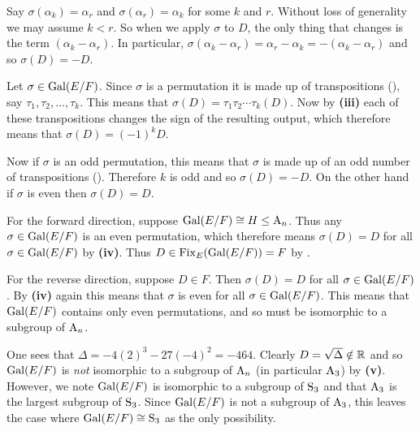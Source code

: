 \begin{questions}
\begin{partquestions}{\roman*}
        \item Say $\sigma(\alpha_k) = \alpha_r$ and $\sigma(\alpha_r) = \alpha_k$ for some $k$ and $r$. Without loss of generality we may assume $k < r$. So when we apply $\sigma$ to $D$, the only thing that changes is the term $(\alpha_k - \alpha_r)$. In particular, $\sigma(\alpha_k - \alpha_r) = \alpha_r - \alpha_k = -(\alpha_k - \alpha_r)$ and so $\sigma(D) = -D$.

        \item Let $\sigma \in \mathrm{Gal}(E/F)$. Since $\sigma$ is a permutation it is made up of transpositions (), say $\tau_1, \tau_2, \dots, \tau_k$. This means that $\sigma(D) = \tau_1\tau_2\cdots\tau_k(D)$. Now by \textbf{(iii)} each of these transpositions changes the sign of the resulting output, which therefore means that $\sigma(D) = (-1)^kD$.

        Now if $\sigma$ is an odd permutation, this means that $\sigma$ is made up of an odd number of transpositions (). Therefore $k$ is odd and so $\sigma(D) = -D$. On the other hand if $\sigma$ is even then $\sigma(D) = D$.

        \item For the forward direction, suppose $\mathrm{Gal}(E/F) \cong H \leq \mathrm{A}_{n}$. Thus any $\sigma \in \mathrm{Gal}(E/F)$ is an even permutation, which therefore means $\sigma(D) = D$ for all $\sigma \in \mathrm{Gal}(E/F)$ by \textbf{(iv)}. Thus $D \in \mathrm{Fix}_{E}(\mathrm{Gal}(E/F)) = F$ by .

        For the reverse direction, suppose $D \in F$. Then $\sigma(D) = D$ for all $\sigma \in \mathrm{Gal}(E/F)$. By \textbf{(iv)} again this means that $\sigma$ is even for all $\sigma \in \mathrm{Gal}(E/F)$. This means that $\mathrm{Gal}(E/F)$ contains only even permutations, and so must be isomorphic to a subgroup of $\mathrm{A}_{n}$.

        \item One sees that $\Delta = -4(2)^3 - 27(-4)^2 = -464$. Clearly $D = \sqrt{\Delta} \notin \mathbb{R}$ and so $\mathrm{Gal}(E/F)$ is \textit{not} isomorphic to a subgroup of $\mathrm{A}_{n}$ (in particular $\mathrm{A}_{3}$) by \textbf{(v)}. However, we note $\mathrm{Gal}(E/F)$ is isomorphic to a subgroup of $\mathrm{S}_{3}$ and that $\mathrm{A}_{3}$ is the largest subgroup of $\mathrm{S}_{3}$. Since $\mathrm{Gal}(E/F)$ is not a subgroup of $\mathrm{A}_{3}$, this leaves the case where $\mathrm{Gal}(E/F) \cong \mathrm{S}_{3}$ as the only possibility.
    \end{partquestions}
\end{questions}
